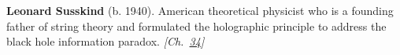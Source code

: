 \textbf{Leonard Susskind} (b. 1940). American theoretical physicist who is a founding father of string theory and formulated the holographic principle to address the black hole information paradox. \emph{[Ch.~\hyperref[ch:boltzmannbrain]{34}]}

